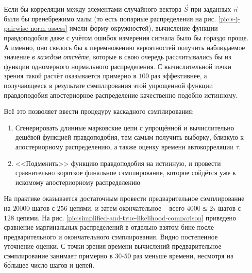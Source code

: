 \documentclass[12pt]{book}
\begin{document}
	Если бы корреляции между элементами случайного вектора $\vec{S}$ при заданных $\vec{n}$ были бы пренебрежимо малы (то есть попарные распределения на рис. \ref{pic:s-j-pairwise-norm-assess} имели форму окружностей), вычисление функции правдоподобия даже с учётом ошибок измерения сигнала было бы гораздо проще. А именно, оно свелось бы к перемножению вероятностей получить наблюдаемое значение \textit{в каждом отсчёте}, которые в свою очередь рассчитывались бы из функции одномерного нормального распределения. С вычислительной точки зрения такой расчёт оказывается примерно в $100$ раз эффективнее, а получающееся в результате сэмплирования этой упрощенной функции правдоподобия апостериорное распределение качественно подобно истинному.

	Всё это позволяет ввести процедуру каскадного сэмплирования:
	
	\begin{enumerate}
		\item Сгенерировать длинные марковские цепи с упрощённой и вычислительно дешёвой функцией правдоподобия, тем самым получить выборку, близкую к апостериорному распределению, а также оценку времени автокорреляции $\tau$.
		\item <<Подменить>> функцию правдоподобия на истинную, и провести сравнительно короткое финальное сэмплирование, которое сойдётся уже к искомому апостериорному распределению
	\end{enumerate}

	На практике оказывается достаточным провести предварительное сэмплирование на $20000$ шагов с $256$ цепями, и затем окончательное -- всего $4000 \approxeq 2 \tau$ шагов с $128$ цепями. На рис. \ref{pic:simplified-and-true-likelihood-comparison} приведено сравнение маргинальных распределений в отдельно взятом бине после предварительного и окончательного сэмплирования. Видно постепенное уточнение оценки. С точки зрения времени вычислений предварительное сэмплирование занимает примерно в $30$-$50$ раз меньше времени, несмотря на б\'{о}льшее число шагов и цепей.
\end{document}
